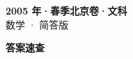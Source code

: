 \documentclass[zihao=-4, a4paper]{ctexart}
\begin{document}
\begin{center}
  {\Large\bfseries 2005 年·春季北京卷·文科}\\[4pt]
  {\large 数学 · 简答版}
\end{center}
\medskip
{}

\clearpage
{}
\begin{center}{\Large\bfseries 答案速查}\end{center}
\medskip

\end{document}

